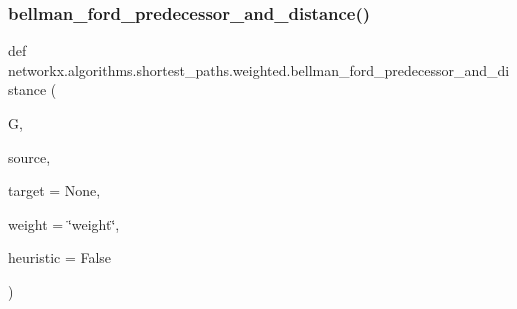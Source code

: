 \subsubsection{\texorpdfstring{bellman\+\_\+ford\+\_\+predecessor\+\_\+and\+\_\+distance()}{bellman\_ford\_predecessor\_and\_distance()}}
{\footnotesize\ttfamily def networkx.\+algorithms.\+shortest\+\_\+paths.\+weighted.\+bellman\+\_\+ford\+\_\+predecessor\+\_\+and\+\_\+distance (\begin{DoxyParamCaption}\item[{}]{G,  }\item[{}]{source,  }\item[{}]{target = {\ttfamily None},  }\item[{}]{weight = {\ttfamily \char`\"{}weight\char`\"{}},  }\item[{}]{heuristic = {\ttfamily False} }\end{DoxyParamCaption})}

